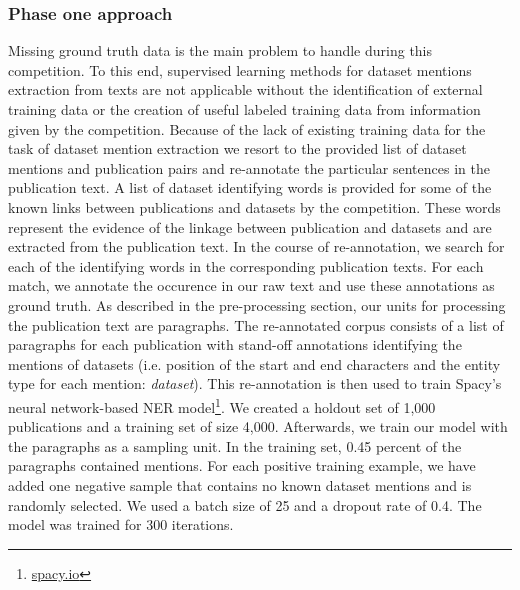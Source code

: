 \subsubsection{Phase one approach}
Missing ground truth data is the main problem to handle during this competition.
To this end, supervised learning methods for dataset mentions extraction from texts are not applicable without the identification of external training data or the creation of useful labeled training data from information given by the competition.
Because of the lack of existing training data for the task of dataset mention extraction we resort to the provided list of dataset mentions and publication pairs and re-annotate the particular sentences in the publication text.
A list of dataset identifying words is provided for some of the known links between publications and datasets by the competition.
These words represent the evidence of the linkage between publication and datasets and are extracted from the publication text.
In the course of re-annotation, we search for each of the identifying words in the corresponding publication texts.
For each match, we annotate the occurence in our raw text and use these annotations as ground truth.
As described in the pre-processing section, our units for processing the publication text are paragraphs.
The re-annotated corpus consists of a list of paragraphs for each publication with stand-off annotations identifying the mentions of datasets (i.e. position of the start and end characters and the entity type for each mention: \emph{dataset}).
This re-annotation is then used to train Spacy's neural network-based NER model\footnote{\url{spacy.io}}.
We created a holdout set of 1,000 publications and a training set of size 4,000.
Afterwards, we train our model with the paragraphs as a sampling unit.
In the training set, 0.45 percent of the paragraphs contained mentions.
For each positive training example, we have added one negative sample that contains no known dataset mentions and is randomly selected.   
We used a batch size of 25 and a dropout rate of 0.4.
The model was trained for 300 iterations.
